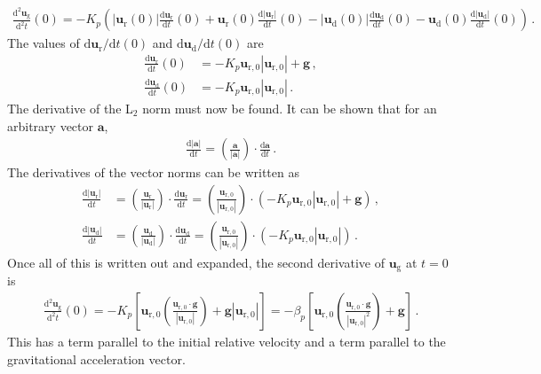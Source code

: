 \begin{align}
    \frac{\text{d}^2 \mathbf{u}_\text{g}}{\text{d}^2 t}(0) = -K_p \left(|\mathbf{u}_\text{r}(0)| \frac{\text{d} \mathbf{u}_\text{r}}{\text{d} t}(0) + \mathbf{u}_\text{r}(0) \frac{\text{d} |\mathbf{u}_\text{r}|}{\text{d} t}(0) - |\mathbf{u}_\text{d}(0)| \frac{\text{d} \mathbf{u}_\text{d}}{\text{d} t}(0) - \mathbf{u}_\text{d}(0) \frac{\text{d} |\mathbf{u}_\text{d}|}{\text{d} t}(0)\right) \,.
\end{align}
The values of $\text{d} \mathbf{u}_\text{r} / \text{d} t(0)$ and $\text{d} \mathbf{u}_\text{d} / \text{d} t(0)$ are
\begin{align*}
    \frac{\text{d} \mathbf{u}_\text{r}}{\text{d} t}(0) &= -K_p \mathbf{u}_{\text{r},0} |\mathbf{u}_{\text{r},0}| + \mathbf{g} \,, \\
    \frac{\text{d} \mathbf{u}_\text{d}}{\text{d} t}(0) &= -K_p \mathbf{u}_{\text{r},0} |\mathbf{u}_{\text{r},0}| \,.
\end{align*}
The derivative of the L$_2$ norm must now be found. It can be shown that for an arbitrary vector $\mathbf{a}$,
\begin{align*}
    \frac{\text{d} |\mathbf{a}|}{\text{d} t} = \left(\frac{\mathbf{a}}{|\mathbf{a}|}\right) \cdot \frac{\text{d} \mathbf{a}}{\text{d} t} \,.
\end{align*}
The derivatives of the vector norms can be written as
\begin{align}
    \frac{\text{d} |\mathbf{u}_\text{r}|}{\text{d} t} &= \left(\frac{\mathbf{u}_\text{r}}{|\mathbf{u}_\text{r}|}\right) \cdot \frac{\text{d} \mathbf{u}_\text{r}}{\text{d} t} = \left(\frac{\mathbf{u}_{\text{r},0}}{|\mathbf{u}_{\text{r},0}|}\right) \cdot (-K_p \mathbf{u}_{\text{r},0} |\mathbf{u}_{\text{r},0}| + \mathbf{g}) \,,  \\
    \frac{\text{d} |\mathbf{u}_\text{d}|}{\text{d} t} &= \left(\frac{\mathbf{u}_\text{d}}{|\mathbf{u}_\text{d}|}\right) \cdot \frac{\text{d} \mathbf{u}_\text{d}}{\text{d} t} = \left(\frac{\mathbf{u}_{\text{r},0}}{|\mathbf{u}_{\text{r},0}|}\right) \cdot (-K_p \mathbf{u}_{\text{r},0} |\mathbf{u}_{\text{r},0}|) \,.
\end{align}
Once all of this is written out and expanded, the second derivative of $\mathbf{u}_\text{g}$ at $t = 0$ is
\begin{align}
    \frac{\text{d}^2 \mathbf{u}_\text{g}}{\text{d}^2 t}(0) = -K_p \left[\mathbf{u}_{\text{r},0} \left(\frac{\mathbf{u}_{\text{r},0} \cdot \mathbf{g}}{|\mathbf{u}_{\text{r},0}|}\right) + \mathbf{g} |\mathbf{u}_{\text{r},0}|\right] = - \beta_p \left[\mathbf{u}_{\text{r},0} \left(\frac{\mathbf{u}_{\text{r},0} \cdot \mathbf{g}}{|\mathbf{u}_{\text{r},0}|^2}\right) + \mathbf{g}\right] \,.
\end{align}
This has a term parallel to the initial relative velocity and a term parallel to the gravitational acceleration vector.

